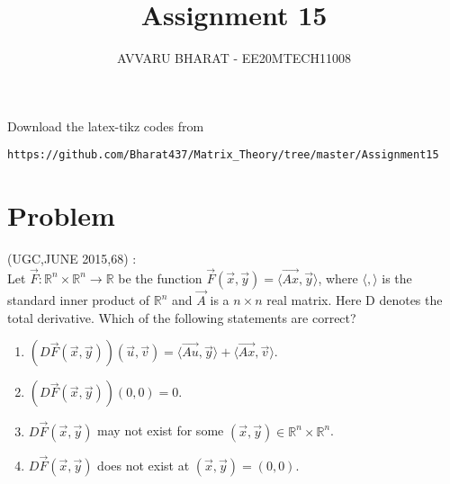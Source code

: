 \documentclass[journal,12pt]{IEEEtran}
\begin{document}
     \def\rightbox#1{\makebox[0in][r]{#1}}
     \def\centbox#1{\makebox[0in]{#1}}
     \def\topbox#1{\raisebox{-\baselineskip}[0in][0in]{#1}}
     \def\midbox#1{\raisebox{-0.5\baselineskip}[0in][0in]{#1}}
\vspace{3cm}
\title{Assignment 15}
\author{AVVARU BHARAT - EE20MTECH11008}
\maketitle
\bigskip
\renewcommand{\thefigure}{\theenumi}
\renewcommand{\thetable}{\theenumi}
%
Download the latex-tikz codes from 
%
\begin{lstlisting}
https://github.com/Bharat437/Matrix_Theory/tree/master/Assignment15
\end{lstlisting}
\section{\textbf{Problem}}
(UGC,JUNE 2015,68) : \\
%
Let $\vec{F}:\mathbb{R}^n\times\mathbb{R}^n\rightarrow\mathbb{R}$ be the function $\vec{F}(\vec{x},\vec{y})=\langle\vec{Ax},\vec{y}\rangle$, where $\langle,\rangle$ is the standard inner product of $\mathbb{R}^n$ and $\vec{A}$ is a $n\times n$ real matrix. Here D denotes the total derivative. Which of the following statements are correct?
\begin{enumerate}
    \item $(D\vec{F}(\vec{x},\vec{y}))(\vec{u},\vec{v})=\langle\vec{Au},\vec{y}\rangle+\langle\vec{Ax},\vec{v}\rangle$.
    \item $(D\vec{F}(\vec{x},\vec{y}))(0,0)=0$.
    \item $D\vec{F}(\vec{x},\vec{y})$ may not exist for some $(\vec{x},\vec{y})\in\mathbb{R}^n\times\mathbb{R}^n$.
    \item $D\vec{F}(\vec{x},\vec{y})$ does not exist at $(\vec{x},\vec{y})=(0,0)$.
\end{enumerate}
\end{document}
